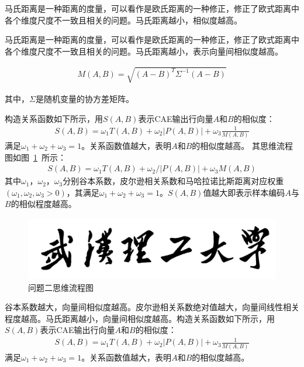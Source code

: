 \documentclass{whutmod}
\begin{document}
\begin{itemize}
\begin{itemize}
				马氏距离是一种距离的度量，可以看作是欧氏距离的一种修正，修正了欧式距离中各个维度尺度不一致且相关的问题。马氏距离越小，相似度越高。

				马氏距离是一种距离的度量，可以看作是欧氏距离的一种修正，修正了欧式距离中各个维度尺度不一致且相关的问题。马氏距离越小，表示向量间相似度越高。

				\begin{gather}
				M(A,B)=\sqrt{(A-B)^T\Sigma^{-1}(A-B)}
				\end{gather}
			\end{itemize}
			其中，$\Sigma$是随机变量的协方差矩阵。
			

			构造关系函数如下所示，用$S(A,B)$表示CAE输出行向量$A$和$B$的相似度：
			\begin{gather}
			S(A,B)=\omega_1 T(A,B)+\omega_2 |P(A,B)|+\omega_3 \displaystyle \frac{1}{M(A,B)}
			\end{gather}
			满足$\omega_1+\omega_2+\omega_3=1$。关系函数值越大，表明$A$和$B$的相似度越高。
    		其思维流程图如图~\ref{lssssct}~所示：
			\begin{gather}
			S(A,B)=\omega_1 T(A,B)+\omega_2/ |P(A,B)|+\omega_3 M(A,B)
			\end{gather}
			其中$\omega_1$，$\omega_2$，$\omega_3$分别谷本系数，皮尔逊相关系数和马哈拉诺比斯距离对应权重$(\omega_1,\omega_2,\omega_3>0)$，其满足$\omega_1+\omega_2+\omega_3=1$。$S(A,B)$值越大即表示样本编码$A$与$B$的相似程度越高。


			\begin{figure}[H]
				\centering
				\includegraphics[width=\textwidth]{figures/whut.jpg}
				\caption{问题二思维流程图}\label{lssssct}
			\end{figure}

				谷本系数越大，向量间相似度越高。皮尔逊相关系数绝对值越大，向量间线性相关程度越高。马氏距离越小，向量间相似度越高。构造关系函数如下所示，用$S(A,B)$表示CAE输出行向量$A$和$B$的相似度：
	\begin{gather}
	S(A,B)=\omega_1 T(A,B)+\omega_2 |P(A,B)|+\omega_3 \displaystyle \frac{1}{M(A,B)}
	\end{gather}
	满足$\omega_1+\omega_2+\omega_3=1$。关系函数值越大，表明$A$和$B$的相似度越高。
	




\end{itemize}
\end{document}
